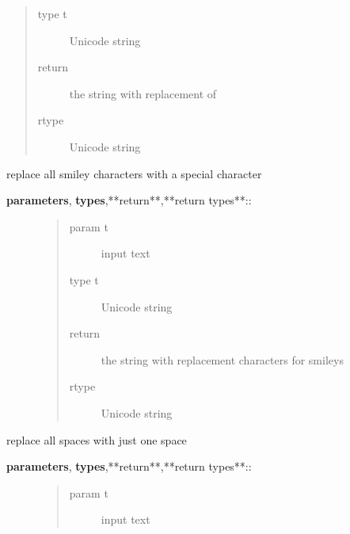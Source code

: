 \documentclass[letterpaper,10pt,english]{sphinxmanual}
\begin{document}
\begin{fulllineitems}
\begin{fulllineitems}
\begin{description}
\begin{quote}
\begin{description}
\item[{type t}] \leavevmode
Unicode string

\item[{return}] \leavevmode
the string with replacement of \textbar{}

\item[{rtype}] \leavevmode
Unicode string

\end{description}\end{quote}

\end{description}

\end{fulllineitems}


\begin{fulllineitems}
\label{API:norm.prepro.rewrite.Rewrite.replace_smileys}
replace all smiley characters with a special character
\begin{description}
\item[{\textbf{parameters}, \textbf{types},**return**,**return types**::}] \leavevmode\begin{quote}\begin{description}
\item[{param t}] \leavevmode
input text

\item[{type t}] \leavevmode
Unicode string

\item[{return}] \leavevmode
the string with replacement characters for smileys

\item[{rtype}] \leavevmode
Unicode string

\end{description}\end{quote}

\end{description}

\end{fulllineitems}


\begin{fulllineitems}
\label{API:norm.prepro.rewrite.Rewrite.replace_spaces}
replace all spaces with just one space
\begin{description}
\item[{\textbf{parameters}, \textbf{types},**return**,**return types**::}] \leavevmode\begin{quote}\begin{description}
\item[{param t}] \leavevmode
input text


\end{description}
\end{quote}
\end{description}
\end{fulllineitems}
\end{fulllineitems}
\end{document}
